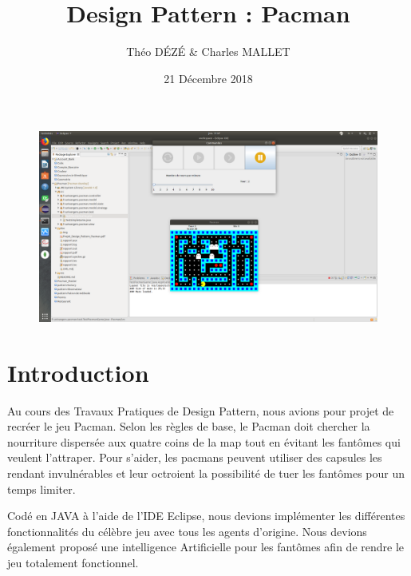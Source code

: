 \documentclass[a4paper, 11pt]{article}
\begin{document}
\title{Design Pattern : Pacman}
\author{Théo \textsc{DÉZÉ}  \& Charles \textsc {MALLET}}
\date{21 Décembre 2018} 


\maketitle

\vspace{2cm}
\begin{figure}[ht]

\includegraphics[scale=0.7,trim=26.2cm 5cm 23.9cm 17.7cm, clip=true]{img/Pacman.png}

\end{figure}


\newpage

\tableofcontents

\pagebreak

\part*{Introduction}

Au cours des Travaux Pratiques de Design Pattern, nous avions pour projet de recréer le jeu Pacman. Selon les règles de base, le Pacman doit chercher la nourriture dispersée aux quatre 
coins de la map tout en évitant les fantômes qui veulent l'attraper. Pour s'aider, les pacmans peuvent utiliser des capsules les rendant invulnérables et leur octroient 
la possibilité de tuer les fantômes pour un temps limiter.

Codé en JAVA à l'aide de l'IDE Eclipse, nous devions implémenter les différentes fonctionnalités du célèbre jeu avec tous les agents d'origine. Nous devions également
proposé une intelligence Artificielle pour les fantômes afin de rendre le jeu totalement fonctionnel. 
\end{document}
